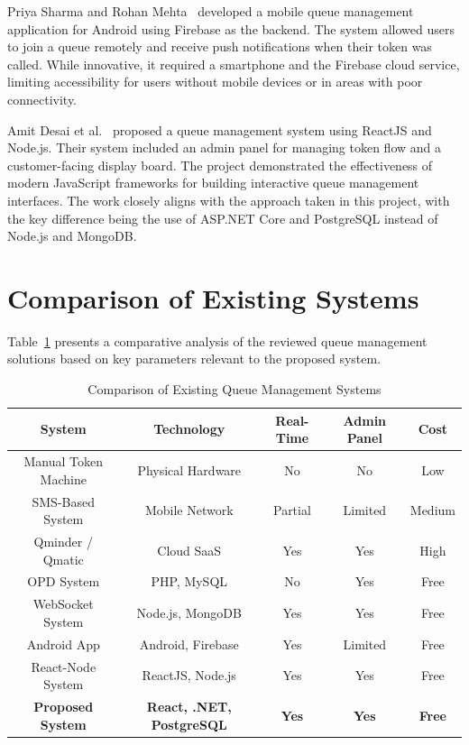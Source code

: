 Priya Sharma and Rohan Mehta~\cite{sharma2021} developed a mobile queue management application for Android using Firebase as the backend. The system allowed users to join a queue remotely and receive push notifications when their token was called. While innovative, it required a smartphone and the Firebase cloud service, limiting accessibility for users without mobile devices or in areas with poor connectivity.

Amit Desai et al.~\cite{desai2022} proposed a queue management system using ReactJS and Node.js. Their system included an admin panel for managing token flow and a customer-facing display board. The project demonstrated the effectiveness of modern JavaScript frameworks for building interactive queue management interfaces. The work closely aligns with the approach taken in this project, with the key difference being the use of ASP.NET Core and PostgreSQL instead of Node.js and MongoDB.

\section{Comparison of Existing Systems}

Table~\ref{tab:comparison} presents a comparative analysis of the reviewed queue management solutions based on key parameters relevant to the proposed system.

\begin{table}[htbp]
    \centering
    \begin{tabular}{|c|c|c|c|c|}
        \hline
        \textbf{System} & \textbf{Technology} & \textbf{Real-Time} & \textbf{Admin Panel} & \textbf{Cost} \\
        \hline
        Manual Token Machine & Physical Hardware & No & No & Low \\
        \hline
        SMS-Based System & Mobile Network & Partial & Limited & Medium \\
        \hline
        Qminder / Qmatic & Cloud SaaS & Yes & Yes & High \\
        \hline
        OPD System \cite{garg2019} & PHP, MySQL & No & Yes & Free \\
        \hline
        WebSocket System \cite{alazzawi2020} & Node.js, MongoDB & Yes & Yes & Free \\
        \hline
        Android App \cite{sharma2021} & Android, Firebase & Yes & Limited & Free \\
        \hline
        React-Node System \cite{desai2022} & ReactJS, Node.js & Yes & Yes & Free \\
        \hline
        \textbf{Proposed System} & \textbf{React, .NET, PostgreSQL} & \textbf{Yes} & \textbf{Yes} & \textbf{Free} \\
        \hline
    \end{tabular}
    \caption{Comparison of Existing Queue Management Systems}
    \label{tab:comparison}
\end{table}

